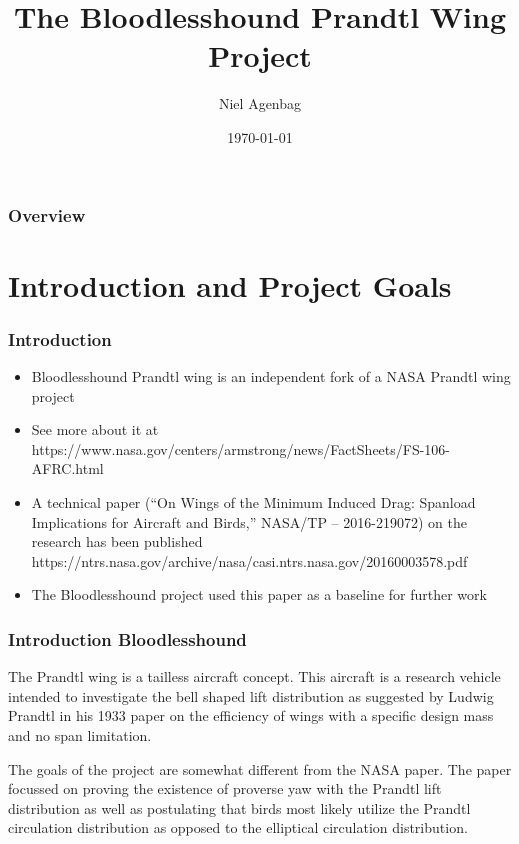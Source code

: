 \documentclass{beamer}
\title[Bloodlesshound]{The Bloodlesshound Prandtl Wing Project} %
\author{Niel Agenbag} %
\institute[Unaffiliated] %
{
Unaffiliated \\ %
\medskip
\textit{Ludwigprandtlwing@gmail.com} %
}
\date{\today} %
\begin{document}
\begin{frame}
\titlepage %
\end{frame}

\begin{frame}
\frametitle{Overview} %
\tableofcontents %
\end{frame}


\section{Introduction and Project Goals}

\begin{frame}
\frametitle{Introduction}
\begin{itemize}
\item Bloodlesshound Prandtl wing is an independent fork of a NASA Prandtl wing project
\item See more about it at https://www.nasa.gov/centers/armstrong/news/FactSheets/FS-106-AFRC.html
\item A technical paper (“On Wings of the Minimum Induced Drag: Spanload Implications for Aircraft and Birds,” NASA/TP – 2016-219072) on the research has been published
https://ntrs.nasa.gov/archive/nasa/casi.ntrs.nasa.gov/20160003578.pdf
\item The Bloodlesshound project used this paper as a baseline for further work
\end{itemize}
\end{frame}



\begin{frame}
\frametitle{Introduction Bloodlesshound}

The Prandtl wing is a tailless aircraft concept.  This aircraft is a research vehicle intended to investigate the bell shaped 
lift distribution as suggested by Ludwig Prandtl in his 1933 paper on the efficiency of wings with a specific design mass 
and no span limitation.

The goals of the project are somewhat different from the NASA paper.  The paper focussed on proving the existence of proverse yaw with the Prandtl lift distribution as well as postulating that birds most likely utilize the Prandtl circulation distribution as opposed to the elliptical circulation distribution.  

\end{frame}
\end{document}
